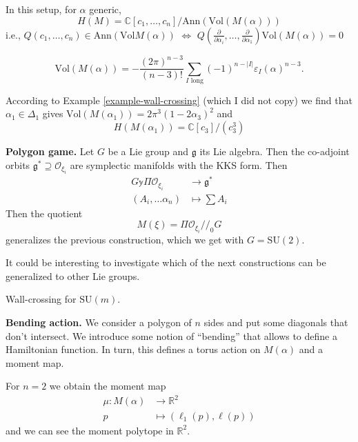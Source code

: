 \begin{theorem}
\label{theorem-Guillemin-Stenberg}
In this setup, for $\alpha$ generic,
$$
H(M)=\mathbb{C}[c_1,\ldots,c_n]/\text{Ann}(\text{Vol}(M(\alpha)))
$$
i.e., $Q(c_1,\ldots,c_n) \in \text{Ann}(\text{Vol}M(\alpha))$ 
$\iff$ $Q\left(\frac{\partial }{\partial \alpha_i},\ldots,
\frac{\partial }{\partial \alpha_1}\right)
\text{Vol}(M(\alpha))=0$
\end{theorem}

\begin{theorem}
\label{theorem-Takakura-The-Koi}
$$
\text{Vol}(M(\alpha))
=-\frac{(2\pi)^{n-3}}{(n-3)!}
\sum_{I\text{ long}}(-1)^{n-|I|}\varepsilon_I(\alpha)^{n-3}.
$$
\end{theorem}

\begin{example}
\label{example-Delta1}
According to Example \ref{example-wall-crossing} (which I
did not copy) we find that
$\alpha_1 \in \Delta_1$ gives $\text{Vol}(M(\alpha_1))=2\pi^3(1-2\alpha_3)^2$
and
$$
H(M(\alpha_1))=\mathbb{C}[c_3]/(c_3^3)
$$
\end{example}

\medskip\noindent
{\bf Polygon game.}
Let $G$ be a Lie group and $\mathfrak{g}$ its Lie algebra.
Then the co-adjoint orbits
$\mathfrak{g}^*  \supseteq \mathcal{O}_{\xi_i}$ 
are symplectic manifolds with the KKS form.
Then
\begin{align*}
G\mathbb{y} \Pi \mathcal{O}_{\xi_i}  &\longrightarrow \mathfrak{g}^* \\
(A_i,\ldots\alpha_n) &\longmapsto \sum A_i
\end{align*}
Then the quotient
$$
M(\xi)=\Pi \mathcal{O}_{\xi_i}/\!/_0 G
$$
generalizes the previous construction,
which we get with $G=\text{SU}(2)$.

It could be interesting to investigate
which of the next constructions can be generalized
to other Lie groups.

\begin{theorem}
\label{theorem-Sotillo}
Wall-crossing for $\text{SU}(m)$.
\end{theorem}

\medskip\noindent
{\bf Bending action.}
We consider a polygon of $n$ sides
and put some diagonals that don't intersect.
We introduce some
notion of ``bending'' that allows
to define a Hamiltonian function.
In turn, this defines a torus action on $M(\alpha)$
and a moment map. 

For $n=2$ we obtain the moment map
\begin{align*}
\mu: M(\alpha) &\longrightarrow \mathbb{R}^2 \\
p &\longmapsto (\ell_1(p),\ell(p))
\end{align*}
and we can see the moment polytope in $\mathbb{R}^2$.

